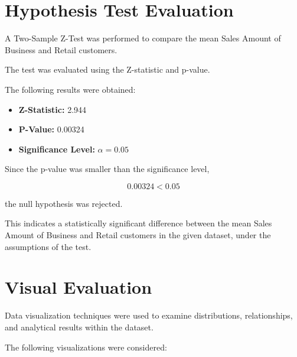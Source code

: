 \documentclass[12pt,a4paper]{report}
\begin{document}
\section{Hypothesis Test Evaluation}

A Two-Sample Z-Test was performed
to compare the mean Sales Amount
of Business and Retail customers.

The test was evaluated using
the Z-statistic and p-value.

The following results were obtained:

\begin{itemize}

    \item \textbf{Z-Statistic:} 2.944

    \item \textbf{P-Value:} 0.00324

    \item \textbf{Significance Level:}
    $\alpha = 0.05$

\end{itemize}

Since the p-value was smaller
than the significance level,

\[
0.00324 < 0.05
\]

the null hypothesis was rejected.

This indicates a statistically
significant difference between
the mean Sales Amount of Business
and Retail customers in the
given dataset, under the
assumptions of the test.


\section{Visual Evaluation}

Data visualization techniques were
used to examine distributions,
relationships, and analytical
results within the dataset.

The following visualizations
were considered:
\end{document}
